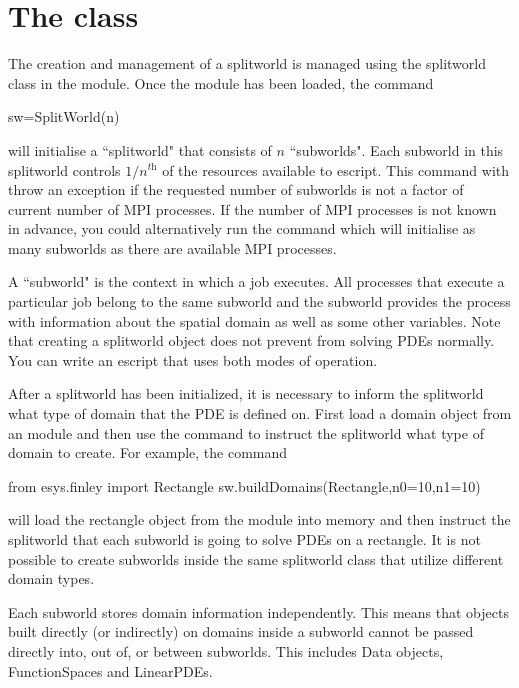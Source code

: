\section{The  class}
The creation and management of a splitworld is managed using the splitworld class in the \escript module. Once the \escript module has been loaded, the command
\begin{python}
sw=SplitWorld(n) 
\end{python}
will initialise a ``splitworld" that consists of $n$ ``subworlds". Each subworld in this splitworld controls $1/n^\textit{th}$ of the resources available to escript. This command with throw an exception if the requested number of subworlds is not a factor of current number of MPI processes. If the number of MPI processes is not known in advance, you could alternatively run the command  which will initialise as many subworlds as there are available MPI processes.

\vspace{\baselineskip}
\noindent A ``subworld" is the context in which a job executes. All processes that execute a particular job belong to the same subworld and the subworld provides the process with information about the spatial domain as well as some other variables. Note that creating a splitworld object does not prevent \escript from solving PDEs normally. You can write an escript that uses both modes of operation.

\vspace{\baselineskip}
\noindent After a splitworld has been initialized, it is necessary to inform the splitworld what type of domain that the PDE is defined on. First load a domain object from an \escript module and then use the command  to instruct the splitworld what type of domain to create. For example, the command
\begin{python}
from esys.finley import Rectangle
sw.buildDomains(Rectangle,n0=10,n1=10)
\end{python}
will load the rectangle object from the \finley module into memory and then instruct the splitworld  that each subworld is going to solve PDEs on a \finley rectangle. It is not possible to create subworlds inside the same splitworld class that utilize different domain types.

\vspace{\baselineskip}
\noindent Each subworld stores domain information independently. This means that objects built directly (or indirectly) on domains inside a subworld cannot be passed directly into, out of, or between subworlds. This includes Data objects, FunctionSpaces and LinearPDEs.

